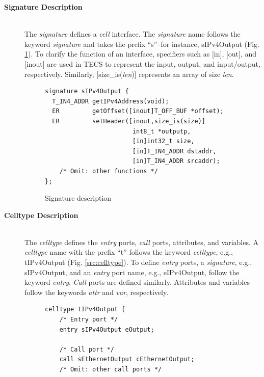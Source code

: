 \documentclass[conference]{IEEEtran/IEEEtran}
\begin{document}
\begin{description}
    \item[{\bf Signature Description}]\mbox{}\\
        The {\it signature} defines a {\it cell} interface.
        The {\it signature} name follows the keyword {\it signature} and takes the prefix ``s''--for instance, sIPv4Output (Fig. \ref{src:signature}).
        To clarify the function of an interface, specifiers such as [in], [out], and [inout] are used in TECS to represent the input, output, and input/output, respectively.
        Similarly, [size\_is({\it len})] represents an array of size {\it len}.
\begin{figure}[t]
\centering
\begin{lstlisting}
signature sIPv4Output {
  T_IN4_ADDR getIPv4Address(void);
  ER         getOffset([inout]T_OFF_BUF *offset);
  ER         setHeader([inout,size_is(size)]
                        int8_t *outputp,
                        [in]int32_t size,
                        [in]T_IN4_ADDR dstaddr,
                        [in]T_IN4_ADDR srcaddr);
    /* Omit: other functions */
};
\end{lstlisting}
\caption{Signature description}
\label{src:signature}
\end{figure}
    \item[{\bf Celltype Description}]\mbox{}\\
        The {\it celltype} defines the {\it entry} ports, {\it call} ports, attributes, and variables.
        A {\it celltype} name with the prefix ``t'' follows the keyword {\it celltype}, e.g., tIPv4Output (Fig. \ref{src:celltype}).
        To define {\it entry} ports, a {\it signature}, e.g., sIPv4Output, and an {\it entry} port name, e.g., eIPv4Output, follow the keyword {\it entry}.
        {\it Call} ports are defined similarly.
        Attributes and variables follow the keywords {\it attr} and {\it var}, respectively.
\begin{figure}[t]
\centering
\begin{lstlisting}
celltype tIPv4Output {
    /* Entry port */
    entry sIPv4Output eOutput;

    /* Call port */
    call sEthernetOutput cEthernetOutput;
    /* Omit: other call ports */


\end{lstlisting}
\end{figure}
\end{description}
\end{document}
